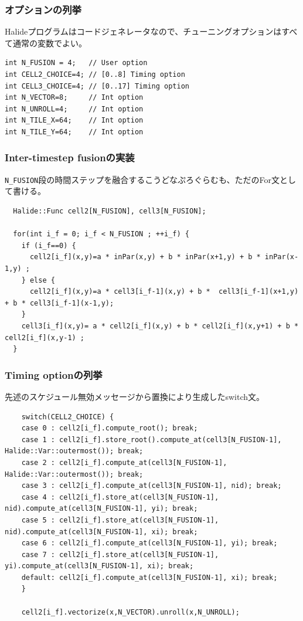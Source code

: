\documentclass[dvipdfmx,cjk]{beamer}
\begin{document}
\begin{frame}[fragile]\frametitle{オプションの列挙}

Halideプログラムはコードジェネレータなので、チューニングオプションはすべて通常の変数でよい。

\begingroup \fontsize{8pt}{9pt}\selectfont
\begin{verbatim}
int N_FUSION = 4;   // User option
int CELL2_CHOICE=4; // [0..8] Timing option
int CELL3_CHOICE=4; // [0..17] Timing option
int N_VECTOR=8;     // Int option
int N_UNROLL=4;     // Int option
int N_TILE_X=64;    // Int option
int N_TILE_Y=64;    // Int option
\end{verbatim}
\endgroup

\end{frame}


\begin{frame}[fragile]\frametitle{Inter-timestep fusionの実装}

{\tt N\_FUSION}段の時間ステップを融合するこうどなぷろぐらむも、ただのFor文として書ける。

\begingroup \fontsize{8pt}{9pt}\selectfont
\begin{verbatim}
  Halide::Func cell2[N_FUSION], cell3[N_FUSION];

  for(int i_f = 0; i_f < N_FUSION ; ++i_f) {
    if (i_f==0) {
      cell2[i_f](x,y)=a * inPar(x,y) + b * inPar(x+1,y) + b * inPar(x-1,y) ;
    } else {
      cell2[i_f](x,y)=a * cell3[i_f-1](x,y) + b *  cell3[i_f-1](x+1,y) + b * cell3[i_f-1](x-1,y);
    }
    cell3[i_f](x,y)= a * cell2[i_f](x,y) + b * cell2[i_f](x,y+1) + b * cell2[i_f](x,y-1) ;
  }
\end{verbatim}
\endgroup
\end{frame}



\begin{frame}[fragile]\frametitle{Timing optionの列挙}

先述のスケジュール無効メッセージから置換により生成したswitch文。

\begingroup \fontsize{8pt}{9pt}\selectfont
\begin{verbatim}
    switch(CELL2_CHOICE) {
    case 0 : cell2[i_f].compute_root(); break; 
    case 1 : cell2[i_f].store_root().compute_at(cell3[N_FUSION-1], Halide::Var::outermost()); break; 
    case 2 : cell2[i_f].compute_at(cell3[N_FUSION-1], Halide::Var::outermost()); break; 
    case 3 : cell2[i_f].compute_at(cell3[N_FUSION-1], nid); break; 
    case 4 : cell2[i_f].store_at(cell3[N_FUSION-1], nid).compute_at(cell3[N_FUSION-1], yi); break; 
    case 5 : cell2[i_f].store_at(cell3[N_FUSION-1], nid).compute_at(cell3[N_FUSION-1], xi); break; 
    case 6 : cell2[i_f].compute_at(cell3[N_FUSION-1], yi); break; 
    case 7 : cell2[i_f].store_at(cell3[N_FUSION-1], yi).compute_at(cell3[N_FUSION-1], xi); break; 
    default: cell2[i_f].compute_at(cell3[N_FUSION-1], xi); break; 
    }

    cell2[i_f].vectorize(x,N_VECTOR).unroll(x,N_UNROLL);
\end{verbatim}
\endgroup
\end{frame}
\end{document}
